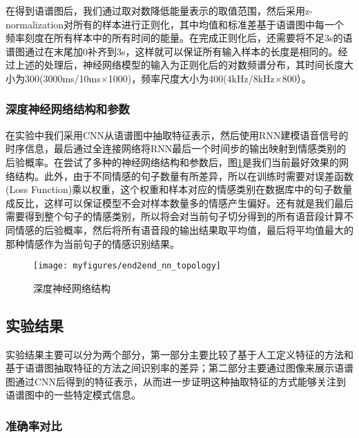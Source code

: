 在得到语谱图后，我们通过取对数降低能量表示的取值范围，然后采用z-normalization对所有的样本进行正则化，其中均值和标准差基于语谱图中每一个频率刻度在所有样本中的所有时间的能量。在完成正则化后，还需要将不足3s的语谱图通过在末尾加0补齐到3s，这样就可以保证所有输入样本的长度是相同的。经过上述的处理后，神经网络模型的输入为正则化后的对数频谱分布，其时间长度大小为300(3000ms/10ms$\times$1000)，频率尺度大小为400(4kHz/8kHz$\times$800）。

\subsubsection{深度神经网络结构和参数}
\label{ssec:end2end_nn_topology}

在实验中我们采用CNN从语谱图中抽取特征表示，然后使用RNN建模语音信号的时序信息，最后通过全连接网络将RNN最后一个时间步的输出映射到情感类别的后验概率。在尝试了多种的神经网络结构和参数后，图\ref{fig:end2end_nn_topology}是我们当前最好效果的网络结构。此外，由于不同情感的句子数量有所差异，所以在训练时需要对误差函数(Loss Function)乘以权重，这个权重和样本对应的情感类别在数据库中的句子数量成反比，这样可以保证模型不会对样本数量多的情感产生偏好。还有就是我们最后需要得到整个句子的情感类别，所以将会对当前句子切分得到的所有语音段计算不同情感的后验概率，然后将所有语音段的输出结果取平均值，最后将平均值最大的那种情感作为当前句子的情感识别结果。

\begin{figure}[htb] %
    \centering
    \texttt{[image: myfigures/end2end\_nn\_topology]}
    \caption{深度神经网络结构}
    \label{fig:end2end_nn_topology}
\end{figure}

\subsection{实验结果}
\label{ssec:end2end_experiment_result}

实验结果主要可以分为两个部分，第一部分主要比较了基于人工定义特征的方法和基于语谱图抽取特征的方法之间识别率的差异；第二部分主要通过图像来展示语谱图通过CNN后得到的特征表示，从而进一步证明这种抽取特征的方式能够关注到语谱图中的一些特定模式信息。

\subsubsection{准确率对比}
\label{sssec:end2end_acc_comp}

